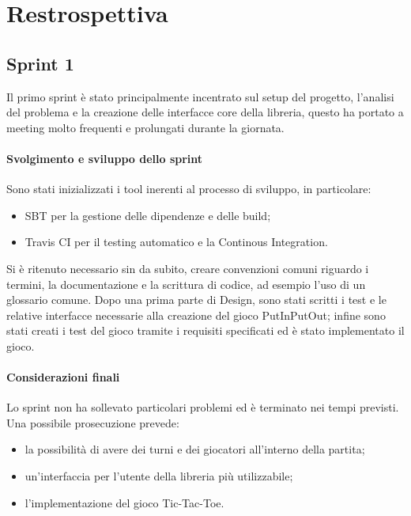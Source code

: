 \section{Restrospettiva}



\subsection{Sprint 1}
Il primo sprint è stato principalmente incentrato sul setup del progetto, l'analisi del problema e la creazione delle interfacce core della libreria, questo ha portato a meeting molto frequenti e prolungati durante la giornata.
\paragraph{Svolgimento e sviluppo dello sprint}
Sono stati inizializzati i tool inerenti al processo di sviluppo, in particolare:
\begin{itemize}
   \item SBT per la gestione delle dipendenze e delle build;
   \item Travis CI per il testing automatico e la Continous Integration.
\end{itemize}
Si è ritenuto necessario sin da subito, creare convenzioni comuni riguardo i termini, la documentazione e la scrittura di codice, ad esempio l'uso di un glossario comune.
Dopo una prima parte di Design, sono stati scritti i test e le relative interfacce necessarie alla creazione del gioco PutInPutOut; infine sono stati creati i test del gioco tramite i requisiti specificati ed è stato implementato il gioco.
\paragraph{Considerazioni finali}
Lo sprint non ha sollevato particolari problemi ed è terminato nei tempi previsti.
Una possibile prosecuzione prevede:
\begin{itemize}
  \item la possibilità di avere dei turni e dei giocatori all'interno della partita;
  \item un'interfaccia per l'utente della libreria più utilizzabile;
  \item l'implementazione del gioco Tic-Tac-Toe.
\end{itemize} 
